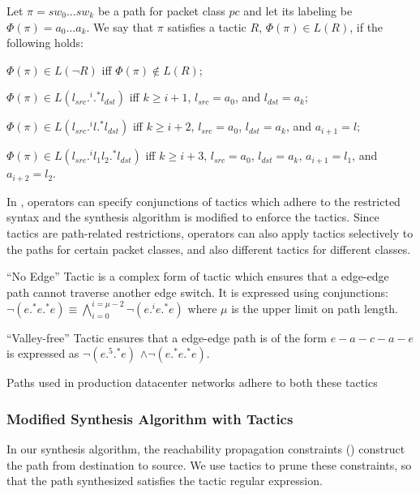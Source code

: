 Let $\pi = sw_0\ldots sw_k$ be a path for packet class $pc$
and let its labeling be $\Phi(\pi)= a_0\ldots a_k$.
We say that $\pi$ satisfies a tactic $R$,  $\Phi(\pi) \in L(R)$, if the following
holds:
\begin{compact2itemize}
\item $\Phi(\pi) \in L(\neg R)$ iff $\Phi(\pi) \not\in L(R)$;
\item $\Phi(\pi) \in L( l_{src} .^i .^* l_{dst})$ iff $k\geq i+1$, $l_{src}= a_0$, and $l_{dst}= a_k$; 
\item $\Phi(\pi)  \in L (l_{src} .^i l.^* l_{dst})$ iff $k\geq i+2$, $l_{src}= a_0$, $l_{dst}= a_k$, and $a_{i+1}=l$;
\item $\Phi(\pi)  \in L( l_{src} .^i l_1 l_2.^* l_{dst})$ iff $k\geq i+3$, $l_{src}= a_0$, $l_{dst}= a_k$, $a_{i+1}=l_1$, and $a_{i+2}=l_2$.
\end{compact2itemize}
In \Name, operators can specify conjunctions of tactics which adhere to the restricted 
syntax and the synthesis algorithm is modified to enforce the tactics. 
Since tactics are path-related restrictions, 
operators can also apply tactics selectively to the paths for certain packet classes, and also different tactics for different classes. 
\begin{example}
``No Edge'' Tactic is a complex form of tactic which ensures that a edge-edge path
cannot traverse another edge switch. It is expressed using conjunctions:
$\neg (e .^* e .^* e)\equiv \bigwedge \limits_{i=0}^{i=\mu-2} \neg (e .^i e .^* e)$ where $\mu$ is the upper limit on path length. 
\end{example}
\begin{example}
``Valley-free'' Tactic ensures
that a edge-edge path is of the form $e-a-c-a-e$ is expressed as
 $\neg (e .^5 .^* e)$ $\wedge \neg (e .^* e .^* e)$. 
\end{example}
Paths used in production datacenter networks adhere to both these
tactics~\cite{vl2-sigcomm09,jupiterrising-sigcomm15}

\subsubsection{Modified Synthesis Algorithm with Tactics}
In our synthesis algorithm, the reachability propagation constraints () 
construct the path from destination to source. We use tactics to prune these constraints, so that
the path synthesized satisfies the tactic regular expression.  

